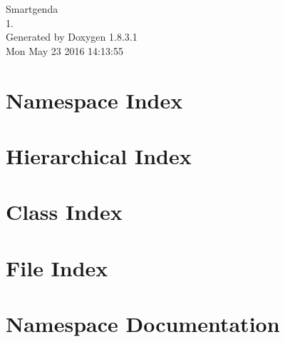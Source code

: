\documentclass{book}
\begin{document}
\hypersetup{pageanchor=false,citecolor=blue}
\begin{titlepage}
\vspace*{7cm}
\begin{center}
{\Large Smartgenda \\[1ex]\large 1. }\\
\vspace*{1cm}
{\large Generated by Doxygen 1.8.3.1}\\
\vspace*{0.5cm}
{\small Mon May 23 2016 14:13:55}\\
\end{center}
\end{titlepage}
\clearemptydoublepage
{}
\tableofcontents
\clearemptydoublepage
{}
\hypersetup{pageanchor=true,citecolor=blue}
\chapter{Namespace Index}

\chapter{Hierarchical Index}

\chapter{Class Index}

\chapter{File Index}

\chapter{Namespace Documentation}






\end{document}
